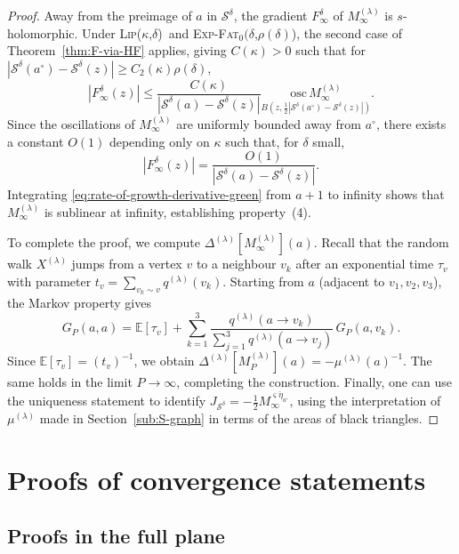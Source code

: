 \documentclass[reqno]{amsart}
\numberwithin{equation}{section}
\theoremstyle{definition}
\theoremstyle{remark}
\newcommand\cS{\mathcal{S}}
\def\LipKd{{\mbox{\textsc{Lip(}$\kappa$\textsc{,}$\delta$\textsc{)}}}}
\def\ExpFat{{{\mbox{\textsc{Exp-Fat}$_0(\delta$\textsc{,}$\rho(\delta)$\textsc{)}}}}}
\begin{document}
\begin{proof}
\medskip
Away from the preimage of $a$ in $\cS^\delta$, the gradient $F_\infty^\delta$ of $M_\infty^{(\lambda)}$ is $s$-holomorphic.  
Under \LipKd\ and \ExpFat, the second case of Theorem~\ref{thm:F-via-HF} applies, giving $C(\kappa)>0$ such that for $|\cS^\delta(a^\circ)-\cS^\delta(z)|\ge C_2(\kappa)\rho(\delta)$,
\begin{equation}
|F_\infty^\delta(z)| \le 
\frac{C(\kappa)}{|\cS^\delta(a)-\cS^\delta(z)|}
\underset{B(z,\tfrac12|\cS^\delta(a^\circ)-\cS^\delta(z)|)}{\mathrm{osc}\, M_\infty^{(\lambda)}}.
\end{equation}
Since the oscillations of $M_\infty^{(\lambda)}$ are uniformly bounded away from $a^\circ$, there exists a constant $O(1)$ depending only on $\kappa$ such that, for $\delta$ small,
\begin{equation}\label{eq:rate-of-growth-derivative-green}
|F_\infty^\delta(z)|=\frac{O(1)}{|\cS^\delta(a)-\cS^\delta(z)|}.
\end{equation}
Integrating \eqref{eq:rate-of-growth-derivative-green} from $a+1$ to infinity shows that $M_\infty^{(\lambda)}$ is sublinear at infinity, establishing property~(4).  

To complete the proof, we compute $\Delta^{(\lambda)}[M_\infty^{(\lambda)}](a)$.  
Recall that the random walk $X^{(\lambda)}$ jumps from a vertex $v$ to a neighbour $v_k$ after an exponential time $\tau_v$ with parameter $t_v=\sum_{v_k\sim v}q^{(\lambda)}(v_k)$.  
Starting from $a$ (adjacent to $v_1,v_2,v_3$), the Markov property gives
\begin{equation}
G_P(a,a)=\mathbb{E}[\tau_v]+\sum_{k=1}^{3}
\frac{q^{(\lambda)}(a\!\to\! v_k)}{\sum_{j=1}^{3}q^{(\lambda)}(a\!\to\! v_j)}\,G_P(a,v_k).
\end{equation}
Since $\mathbb{E}[\tau_v]=(t_v)^{-1}$, we obtain $\Delta^{(\lambda)}[M_P^{(\lambda)}](a)=-\mu^{(\lambda)}(a)^{-1}$.  
The same holds in the limit $P\to\infty$, completing the construction.  
Finally, one can use the uniqueness statement to identify $J_{\cS^\delta}=-\tfrac12 M_\infty^{\overline{\varsigma \eta_{a^\circ}}}$, using the interpretation of $\mu^{(\lambda)}$ made in Section~\ref{sub:S-graph} in terms of the areas of black triangles.
\end{proof}

\section{Proofs of convergence statements}

\subsection{Proofs in the full plane}
\end{document}
